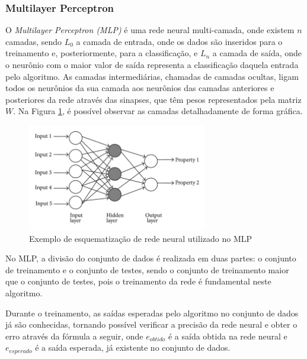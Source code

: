 \documentclass[
	12pt,				%
	openright,			%
	oneside,
	a4paper,			%
	english,			%
	french,				%
	spanish,			%
	brazil				%
	]{abntex2}
\begin{document}
\subsubsection{Multilayer Perceptron}
    O \textit{Multilayer Perceptron (MLP)} é uma rede neural multi-camada, onde existem $n$ camadas, sendo $L_0$ a camada de entrada, onde os dados são inseridos para o treinamento e, posteriormente, para a classificação, e $L_n$ a camada de saída, onde o neurônio com o maior valor de saída representa a classificação daquela entrada pelo algoritmo. As camadas intermediárias, chamadas de camadas ocultas, ligam todos os neurônios da sua camada aos neurônios das camadas anteriores e posteriores da rede através das sinapses, que têm pesos representados pela matriz $W$. Na Figura \ref{fig_mlp}, é possível observar as camadas detalhadamente de forma gráfica.

    \begin{figure}[H]
        \caption{\label{fig_mlp}Exemplo de esquematização de rede neural utilizado no MLP}
        
        \begin{center}
            \includegraphics[width=0.7\textwidth]{mlp.png}
        \end{center}
        
    \end{figure}
    
    No MLP, a divisão do conjunto de dados é realizada em duas partes: o conjunto de treinamento e o conjunto de testes, sendo o conjunto de treinamento maior que o conjunto de testes, pois o treinamento da rede é fundamental neste algoritmo. 
    
    Durante o treinamento, as saídas esperadas pelo algoritmo no conjunto de dados já são conhecidas, tornando possível verificar a precisão da rede neural e obter o erro através da fórmula a seguir, onde $e_{obtido}$ é a saída obtida na rede neural e $e_{esperado}$ é a saída esperada, já existente no conjunto de dados.
    
\end{document}
